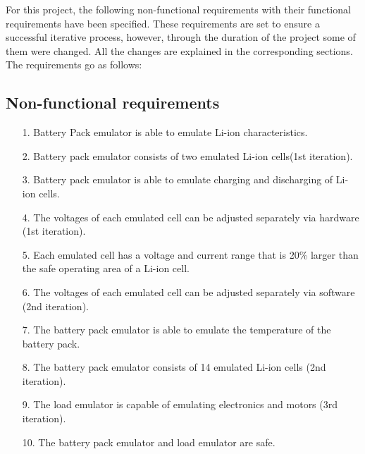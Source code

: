 \IEEEPARstart
{F}{or} this project, the following non-functional requirements with their 
functional requirements have been specified. These requirements are set 
to ensure a successful iterative process, however, through the duration 
of the project some of them were changed. All the changes are explained
in the corresponding sections. The requirements go as follows:

\subsection{Non-functional requirements}
\begin{enumerate}
    \item[1.] Battery Pack emulator is able to emulate Li-ion characteristics.
    \item[2.] Battery pack emulator consists of two emulated Li-ion 
    cells(1st iteration).
    \item[3.] Battery pack emulator is able to emulate charging and discharging of
    Li-ion cells.
    \item[4.] The voltages of each emulated cell can be adjusted separately 
    via hardware (1st iteration).
    \item[5.] Each emulated cell has a voltage and current range that is 20\%
    larger than the safe operating area of a Li-ion cell.
    \item[6.] The voltages of each emulated cell can be adjusted separately 
    via software (2nd iteration).
    \item[7.] The battery pack emulator is able to emulate the temperature of 
    the battery pack.
    \item[8.] The battery pack emulator consists of 14 emulated Li-ion 
    cells (2nd iteration). 
    \item[9.] The load emulator is capable of emulating electronics and 
    motors (3rd iteration).
    \item[10.] The battery pack emulator and load emulator are safe. 
  \end{enumerate}

